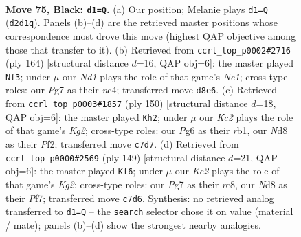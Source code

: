 \documentclass[11pt]{article}
\begin{document}
\clearpage

\begin{figure}[p]\centering
\begin{subfigure}{0.46\textwidth}\centering
\resizebox{\linewidth}{!}{%
\newchessgame
\chessboard[
  setfen={3n4/2k3p1/1p4p1/p1p5/2P5/1P6/1K1p4/8 b - - 1 75},
  showmover=false,
  pgfstyle=straightmove, color=movearrow, markmove={d2-d1}
]}
\caption{}
\end{subfigure}\hfill
\begin{subfigure}{0.46\textwidth}\centering
\resizebox{\linewidth}{!}{%
\newchessgame
\chessboard[
  setfen={8/8/5kp1/7p/2n4P/6P1/5P2/4NK2 w - - 0 83},
  showmover=false,
  pgfstyle=straightmove, color=movearrow, markmove={e1-f3}
]}
\caption{}
\end{subfigure}
\\[4pt]
\begin{subfigure}{0.46\textwidth}\centering
\resizebox{\linewidth}{!}{%
\newchessgame
\chessboard[
  setfen={3R4/5pk1/7p/6p1/6P1/4P2P/5PK1/1r6 w - - 62 76},
  showmover=false,
  pgfstyle=straightmove, color=movearrow, markmove={g2-h2}
]}
\caption{}
\end{subfigure}\hfill
\begin{subfigure}{0.46\textwidth}\centering
\resizebox{\linewidth}{!}{%
\newchessgame
\chessboard[
  setfen={2R5/5pk1/6p1/7p/7P/5KP1/r7/8 b - - 3 75},
  showmover=false,
  pgfstyle=straightmove, color=movearrow, markmove={g7-f6}
]}
\caption{}
\end{subfigure}
\caption{\textbf{Move 75, Black: \texttt{d1=Q}.} (a) Our position; Melanie plays \texttt{d1=Q} (\texttt{d2d1q}). Panels (b)--(d) are the retrieved master positions whose correspondence most drove this move (highest QAP objective among those that transfer to it). (b) Retrieved from \texttt{ccrl\_top\_p0002\#2716} (ply 164) [structural distance $d$=16, QAP obj=6]: the master played \texttt{Nf3}; under $\mu$ our \emph{Nd1} plays the role of that game's \emph{Ne1}; cross-type roles: our \emph{P}g7 as their \emph{n}c4; transferred move \texttt{d8e6}. (c) Retrieved from \texttt{ccrl\_top\_p0003\#1857} (ply 150) [structural distance $d$=18, QAP obj=6]: the master played \texttt{Kh2}; under $\mu$ our \emph{Kc2} plays the role of that game's \emph{Kg2}; cross-type roles: our \emph{P}g6 as their \emph{r}b1, our \emph{N}d8 as their \emph{P}f2; transferred move \texttt{c7d7}. (d) Retrieved from \texttt{ccrl\_top\_p0000\#2569} (ply 149) [structural distance $d$=21, QAP obj=6]: the master played \texttt{Kf6}; under $\mu$ our \emph{Kc2} plays the role of that game's \emph{Kg2}; cross-type roles: our \emph{P}g7 as their \emph{r}c8, our \emph{N}d8 as their \emph{P}f7; transferred move \texttt{c7d6}. Synthesis: no retrieved analog transferred to \texttt{d1=Q} -- the \texttt{search} selector chose it on value (material / mate); panels (b)--(d) show the strongest nearby analogies.}
\label{fig:thought-m149}
\end{figure}
\end{document}
